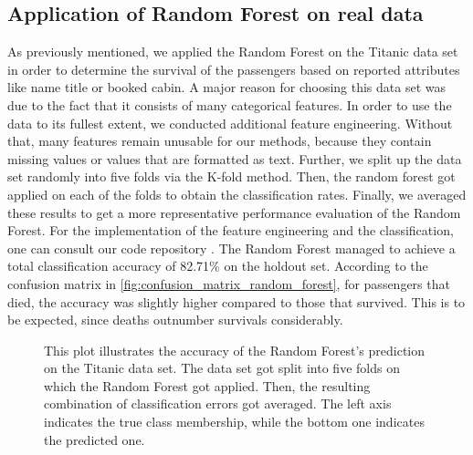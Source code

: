 \subsection{Application of Random Forest on real data}
\label{sec:real_data}
As previously mentioned, we applied the Random Forest on the Titanic data set \cite{titanicData} in order
to determine the survival of the passengers based on reported attributes like name title or booked cabin.
A major reason for choosing this data set was due to the fact that it consists of many categorical features.
In order to use the data to its fullest extent, we conducted additional feature engineering. 
Without that, many features remain unusable for our methods, 
because they contain missing values or values that are formatted as text.
Further, we split up the data set randomly into five folds via the K-fold method.
Then, the random forest got applied on each of the folds to obtain the classification rates.
Finally, we averaged these results to get a more representative performance evaluation of the Random Forest.
For the implementation of the feature engineering and the classification,
one can consult our code repository \cite{githubApplication}.
The Random Forest managed to achieve a total classification accuracy of 82.71\% on the holdout set.
According to the confusion matrix in \autoref{fig:confusion_matrix_random_forest}, for passengers that died, 
the accuracy was slightly higher compared to those that survived. This is to be expected,
since deaths outnumber survivals considerably.

\begin{figure}[H]
    \captionsetup{format=plain}
    \caption
        {This plot illustrates the accuracy of the Random Forest's prediction on the Titanic data set.
        The data set got split into five folds on which the Random Forest got applied. 
        Then, the resulting combination of classification errors got averaged.
        The left axis indicates the true class membership, while the bottom one indicates the predicted one. 
        }
    \label{fig:confusion_matrix_random_forest}
\end{figure}


